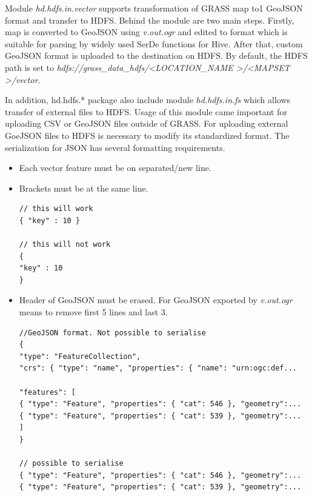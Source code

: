 \documentclass[a4paper,12pt,oneside]{report}
\begin{document}
    Module \textit{hd.hdfs.in.vector} supports transformation of GRASS map to1
    GeoJSON format and transfer to HDFS. Behind the module are two main steps. Firstly, map is
    converted to GeoJSON using \textit{v.out.ogr} and edited to format which is
    suitable for parsing by widely used SerDe functions for Hive. After that,
    custom GeoJSON format is uploaded to the  destination on HDFS. By default, the
    HDFS path is set to \textit{hdfs://grass\_data\_hdfs/\textless LOCATION\_NAME
    	\textgreater/\textless MAPSET \textgreater /vector}.
    
    In addition, hd.hdfs.* package also include module \textit{hd.hdfs.in.fs} which allows
    transfer of external files to HDFS. Usage of this module came important for
    uploading CSV or GeoJSON files outside of GRASS. For uploading external GoeJSON files to HDFS is
    necessary to modify its standardized format. The serialization  for
    JSON has several formatting requirements. %
	
	\begin{itemize}
		\item Each vector feature must be on separated/new line.
		\item Brackets must be at the same line.
		\begin{footnotesize}
			\begin{lstlisting}[style=python]
// this will work
{ "key" : 10 }

// this will not work
{
"key" : 10 
}
			\end{lstlisting}
		\end{footnotesize}
		
		\item Header of GeoJSON must be erased. For GeoJSON exported by
		\textit{v.out.ogr} means to remove first 5 lines and last 3.
		\begin{footnotesize}
			\begin{lstlisting}[style=python]
//GeoJSON format. Not possible to serialise
{
"type": "FeatureCollection",
"crs": { "type": "name", "properties": { "name": "urn:ogc:def...

"features": [
{ "type": "Feature", "properties": { "cat": 546 }, "geometry":...
{ "type": "Feature", "properties": { "cat": 539 }, "geometry":...
]
}

// possible to serialise
{ "type": "Feature", "properties": { "cat": 546 }, "geometry":...
{ "type": "Feature", "properties": { "cat": 539 }, "geometry":...
			\end{lstlisting}
		\end{footnotesize}
	\end{itemize}
	
\end{document}
